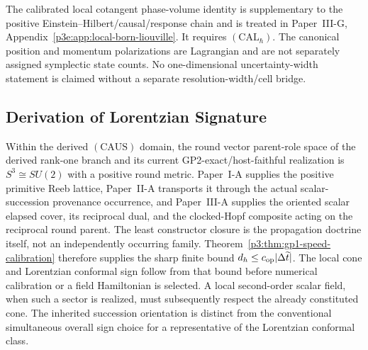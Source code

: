 \documentclass[12pt,a4paper]{article}
\begin{document}
\begin{remark}
The calibrated local cotangent phase-volume identity is supplementary to the
positive Einstein--Hilbert/causal/response chain and is treated in
Paper~III-G, Appendix~\ref{p3e:app:local-born-liouville}.  It requires
\((\mathrm{CAL}_{\hbar})\).  The canonical position and momentum
polarizations are Lagrangian and are not separately assigned symplectic
state counts.  No one-dimensional uncertainty-width statement is claimed
without a separate resolution-width/cell bridge.
\end{remark}

\subsection{Derivation of Lorentzian Signature}
\label{p3:sec:signature}

Within the derived \((\mathrm{CAUS})\) domain, the
round vector parent-role space of the derived rank-one branch and its current
GP2-exact/host-faithful realization is
\(S^3\cong SU(2)\) with a positive round metric.
Paper~I-A supplies the positive primitive Reeb lattice, Paper~II-A transports it
through the actual scalar-succession provenance occurrence, and Paper~III-A
supplies the oriented scalar elapsed cover, its reciprocal dual, and the
clocked-Hopf composite acting on the reciprocal round parent.  The least
constructor closure is the propagation doctrine itself, not an independently
occurring family.  Theorem~\ref{p3:thm:gp1-speed-calibration} therefore
supplies the sharp finite bound
\(d_h\le c_{\rm op}|\Delta\widetilde t|\).
The local cone and Lorentzian conformal sign follow from that bound before
numerical calibration or a field Hamiltonian is selected.  A local
second-order scalar field, when such
a sector is realized, must subsequently respect the already constituted
cone.  The inherited succession orientation is distinct from the conventional
simultaneous overall sign choice for a representative of the Lorentzian
conformal class.
\end{document}
